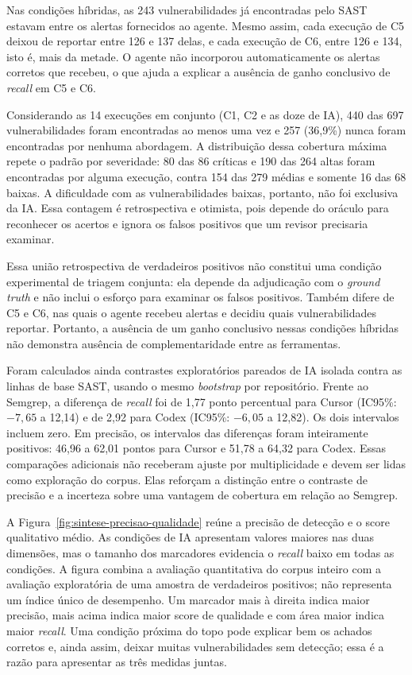 Nas condições híbridas, as 243 vulnerabilidades já encontradas pelo SAST
estavam entre os alertas fornecidos ao agente. Mesmo assim, cada execução de
C5 deixou de reportar entre 126 e 137 delas, e cada execução de C6, entre 126
e 134, isto é, mais da metade. O agente não incorporou automaticamente os
alertas corretos que recebeu, o que ajuda a explicar a ausência de ganho
conclusivo de \textit{recall} em C5 e C6.

Considerando as 14 execuções em conjunto (C1, C2 e as doze de IA), 440 das
697 vulnerabilidades foram encontradas ao menos uma vez e 257 (36,9\%) nunca
foram encontradas por nenhuma abordagem. A distribuição dessa cobertura
máxima repete o padrão por severidade: 80 das 86 críticas e 190 das 264 altas
foram encontradas por alguma execução, contra 154 das 279 médias e somente 16
das 68 baixas. A dificuldade com as vulnerabilidades baixas, portanto, não foi
exclusiva da IA. Essa contagem é retrospectiva e otimista, pois depende do
oráculo para reconhecer os acertos e ignora os falsos positivos que um
revisor precisaria examinar.

Essa união retrospectiva de verdadeiros positivos não constitui uma condição
experimental de triagem conjunta: ela depende da adjudicação com o
\textit{ground truth} e não inclui o esforço para examinar os falsos
positivos. Também difere de C5 e C6, nas quais o agente recebeu alertas
e decidiu quais vulnerabilidades reportar. Portanto, a ausência de um ganho
conclusivo nessas condições híbridas não demonstra ausência de
complementaridade entre as ferramentas.

Foram calculados ainda contrastes exploratórios pareados de IA isolada
contra as linhas de base SAST, usando o mesmo \textit{bootstrap} por
repositório. Frente ao Semgrep, a diferença de \textit{recall} foi de
1,77 ponto percentual para Cursor (IC95\%: $-7,65$ a 12,14) e de 2,92
para Codex (IC95\%: $-6,05$ a 12,82). Os dois intervalos incluem zero.
Em precisão, os intervalos das diferenças foram inteiramente positivos:
46,96 a 62,01 pontos para Cursor e 51,78 a 64,32 para Codex.
Essas comparações adicionais não receberam ajuste por multiplicidade e
devem ser lidas como exploração do corpus. Elas reforçam a distinção entre
o contraste de precisão e a incerteza sobre uma vantagem de cobertura
em relação ao Semgrep.

A Figura~\ref{fig:sintese-precisao-qualidade} reúne a precisão de detecção e o
score qualitativo médio. As condições de IA apresentam valores maiores nas
duas dimensões, mas o tamanho dos marcadores evidencia o \textit{recall} baixo
em todas as condições. A figura combina a avaliação quantitativa do corpus
inteiro com a avaliação exploratória de uma amostra de verdadeiros positivos;
não representa um índice único de desempenho.
Um marcador mais à direita indica maior precisão, mais acima indica maior
score de qualidade e com área maior indica maior \textit{recall}. Uma condição
próxima do topo pode explicar bem os achados corretos e, ainda assim, deixar
muitas vulnerabilidades sem detecção; essa é a razão para apresentar as três
medidas juntas.

